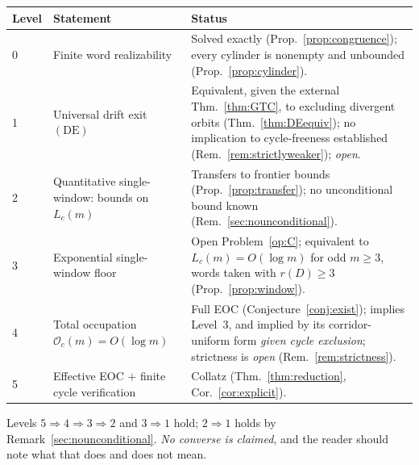 \documentclass[11pt]{article}
\theoremstyle{plain}
\theoremstyle{definition}
\theoremstyle{remark}
\newcommand{\Occ}{\mathcal{O}}
\begin{document}
\begin{center}
\small
\begin{tabular}{@{}llp{}@{}}
\toprule
Level & Statement & Status \\
\midrule
0 & Finite word realizability & Solved exactly (Prop.~\ref{prop:congruence}); every cylinder is
    nonempty and unbounded (Prop.~\ref{prop:cylinder}). \\
1 & Universal drift exit $(\mathrm{DE})$ & Equivalent, given the external Thm.~\ref{thm:GTC}, to
    excluding divergent orbits
    (Thm.~\ref{thm:DEequiv}); no implication to cycle-freeness established
    (Rem.~\ref{rem:strictlyweaker}); \emph{open}. \\
2 & Quantitative single-window: bounds on $L_c(m)$ & Transfers to frontier bounds
    (Prop.~\ref{prop:transfer}); no unconditional bound known (Rem.~\ref{sec:nounconditional}). \\
3 & Exponential single-window floor & Open Problem~\ref{op:C}; equivalent to
    $L_c(m)=O(\log m)$ for odd $m\ge3$, words taken with $r(D)\ge3$
    (Prop.~\ref{prop:window}). \\
4 & Total occupation $\Occ_c(m)=O(\log m)$ & Full EOC (Conjecture~\ref{conj:exist}); implies
    Level~3, and implied by its corridor-uniform form \emph{given cycle exclusion}; strictness is
    \emph{open} (Rem.~\ref{rem:strictness}). \\
5 & Effective EOC $+$ finite cycle verification & Collatz (Thm.~\ref{thm:reduction},
    Cor.~\ref{cor:explicit}). \\
\bottomrule
\end{tabular}
\end{center}

Levels $5\Rightarrow4\Rightarrow3\Rightarrow2$ and $3\Rightarrow1$ hold; $2\Rightarrow1$ holds by
Remark~\ref{sec:nounconditional}. \emph{No converse is claimed}, and the reader should note what
that does and does not mean.
\end{document}
